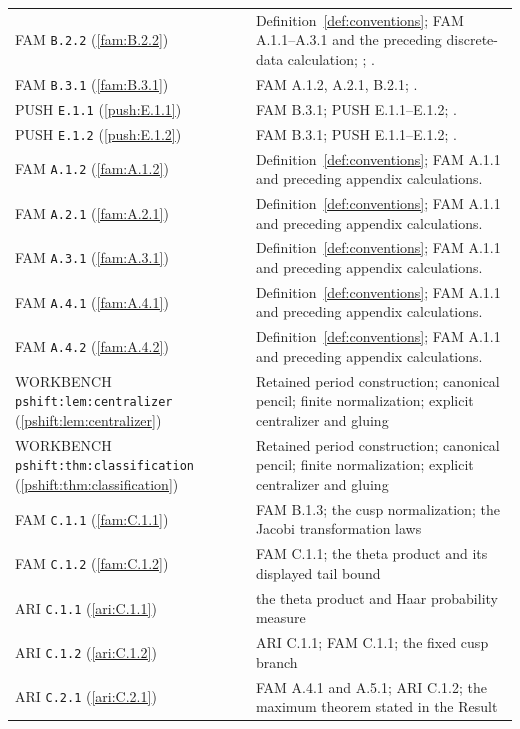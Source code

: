 \documentclass[11pt,a4paper]{article}
\theoremstyle{plain}
\theoremstyle{definition}
\begin{document}
\begin{longtable}{@{}L{.21\linewidth}L{.73\linewidth}@{}}
FAM \nolinkurl{B.2.2} (\ref{fam:B.2.2}) & Definition~\ref{def:conventions}; FAM A.1.1--A.3.1 and the preceding discrete-data calculation; \cite[Section 6.4]{AC26}; \cite[Sections 3 and 5]{E26}.\\
FAM \nolinkurl{B.3.1} (\ref{fam:B.3.1}) & FAM A.1.2, A.2.1, B.2.1; \cite[Proposition 4.7]{VL26}.\\
PUSH \nolinkurl{E.1.1} (\ref{push:E.1.1}) & FAM B.3.1; PUSH E.1.1--E.1.2; \cite[Section 2]{VL26}.\\
PUSH \nolinkurl{E.1.2} (\ref{push:E.1.2}) & FAM B.3.1; PUSH E.1.1--E.1.2; \cite[Section 2]{VL26}.\\
FAM \nolinkurl{A.1.2} (\ref{fam:A.1.2}) & Definition~\ref{def:conventions}; FAM A.1.1 and preceding appendix calculations.\\
FAM \nolinkurl{A.2.1} (\ref{fam:A.2.1}) & Definition~\ref{def:conventions}; FAM A.1.1 and preceding appendix calculations.\\
FAM \nolinkurl{A.3.1} (\ref{fam:A.3.1}) & Definition~\ref{def:conventions}; FAM A.1.1 and preceding appendix calculations.\\
FAM \nolinkurl{A.4.1} (\ref{fam:A.4.1}) & Definition~\ref{def:conventions}; FAM A.1.1 and preceding appendix calculations.\\
FAM \nolinkurl{A.4.2} (\ref{fam:A.4.2}) & Definition~\ref{def:conventions}; FAM A.1.1 and preceding appendix calculations.\\
WORKBENCH \nolinkurl{pshift:lem:centralizer} (\ref{pshift:lem:centralizer}) & Retained period construction; canonical pencil; finite normalization; explicit centralizer and gluing\\
WORKBENCH \nolinkurl{pshift:thm:classification} (\ref{pshift:thm:classification}) & Retained period construction; canonical pencil; finite normalization; explicit centralizer and gluing\\
FAM \nolinkurl{C.1.1} (\ref{fam:C.1.1}) & FAM B.1.3; the cusp normalization; the Jacobi transformation laws\\
FAM \nolinkurl{C.1.2} (\ref{fam:C.1.2}) & FAM C.1.1; the theta product and its displayed tail bound\\
ARI \nolinkurl{C.1.1} (\ref{ari:C.1.1}) & the theta product and Haar probability measure\\
ARI \nolinkurl{C.1.2} (\ref{ari:C.1.2}) & ARI C.1.1; FAM C.1.1; the fixed cusp branch\\
ARI \nolinkurl{C.2.1} (\ref{ari:C.2.1}) & FAM A.4.1 and A.5.1; ARI C.1.2; the maximum theorem stated in the Result\\

\end{longtable}
\end{document}
